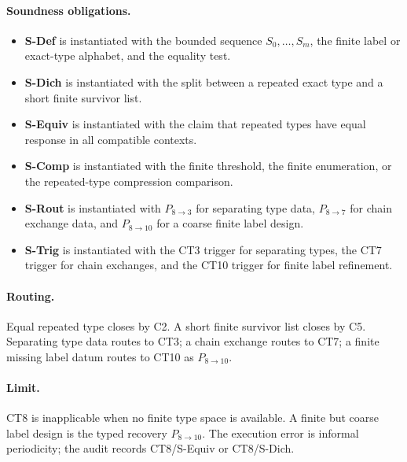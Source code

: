 \documentclass[
  11pt,
]{article}
\providecommand{\tightlist}{%
  \setlength{\itemsep}{0pt}\setlength{\parskip}{0pt}}
\theoremstyle{definition}
\newcommand{\ctpar}[1]{\paragraph{#1.}}
\begin{document}
\ctpar{Soundness obligations}
\begin{itemize}
\tightlist
\item \textbf{S-Def} is instantiated with the bounded sequence \(S_0,\ldots,S_m\), the finite label or exact-type alphabet, and the equality test.
\item \textbf{S-Dich} is instantiated with the split between a repeated exact type and a short finite survivor list.
\item \textbf{S-Equiv} is instantiated with the claim that repeated types have equal response in all compatible contexts.
\item \textbf{S-Comp} is instantiated with the finite threshold, the finite enumeration, or the repeated-type compression comparison.
\item \textbf{S-Rout} is instantiated with \(P_{8\to3}\) for separating type data, \(P_{8\to7}\) for chain exchange data, and \(P_{8\to10}\) for a coarse finite label design.
\item \textbf{S-Trig} is instantiated with the CT3 trigger for separating types, the CT7 trigger for chain exchanges, and the CT10 trigger for finite label refinement.
\end{itemize}

\ctpar{Routing}
Equal repeated type closes by C2.  A short finite survivor list closes by
C5.  Separating type data routes to CT3; a chain exchange routes to CT7;
a finite missing label datum routes to CT10 as \(P_{8\to10}\).

\ctpar{Limit}
CT8 is inapplicable when no finite type space is available. A finite but
coarse label design is the typed recovery \(P_{8\to10}\).  The execution
error is informal periodicity; the audit records CT8/S-Equiv or CT8/S-Dich.
\end{document}
